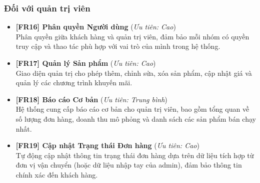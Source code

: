 \subsubsection{Đối với quản trị viên}

\begin{itemize}
    \item \textbf{[FR16] Phân quyền Người dùng} \quad (\textit{Ưu tiên: Cao})\\
    Phân quyền giữa khách hàng và quản trị viên, đảm bảo mỗi nhóm có quyền truy cập và thao tác phù hợp với vai trò của mình trong hệ thống.

\item \textbf{[FR17] Quản lý Sản phẩm} \quad (\textit{Ưu tiên: Cao})\\
    Giao diện quản trị cho phép thêm, chỉnh sửa, xóa sản phẩm, cập nhật giá và quản lý các chương trình khuyến mãi.

\item \textbf{[FR18] Báo cáo Cơ bản} \quad (\textit{Ưu tiên: Trung bình})\\
    Hệ thống cung cấp báo cáo cơ bản cho quản trị viên, bao gồm tổng quan về số lượng đơn hàng, doanh thu mô phỏng và danh sách các sản phẩm bán chạy nhất.

\item \textbf{[FR19] Cập nhật Trạng thái Đơn hàng} \quad (\textit{Ưu tiên: Cao})\\
    Tự động cập nhật thông tin trạng thái đơn hàng dựa trên dữ liệu tích hợp từ đơn vị vận chuyển (hoặc dữ liệu nhập tay của admin), đảm bảo thông tin chính xác đến khách hàng.
    
\end{itemize}